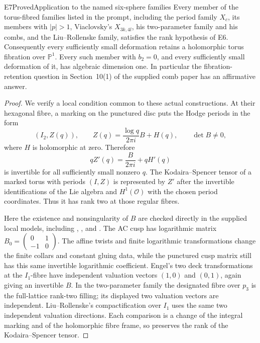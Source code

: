 \begin{statement}{E7}{Proved}{Application to the named six-sphere families}
Every member of the torus-fibred families listed in the prompt,
including the period family $X_c$, its members with $|p|>1$,
Viaclovsky's $X_{3k,4l}$, his two-parameter family and his combs,
and the Liu--Rollenske family, satisfies the rank hypothesis of E6.
Consequently every sufficiently small deformation retains a
holomorphic torus fibration over $\mathbb P^1$. Every such member
with $b_2=0$, and every sufficiently small deformation of it, has
algebraic dimension one. In particular the fibration-retention
question in Section~10(1) of the supplied comb paper has an
affirmative answer.
\end{statement}
\begin{proof}
We verify a local condition common to these actual constructions.
At their hexagonal fibre, a marking on the punctured disc puts
the Hodge periods in the form
\begin{equation}\label{eq:E-log-period}
  (I_2,Z(q)),\qquad
 Z(q)=\frac{\log q}{2\pi i}B+H(q),
 \qquad \det B\ne0,
\end{equation}
where $H$ is holomorphic at zero. Therefore
\[
 qZ'(q)=\frac{B}{2\pi i}+qH'(q)
\]
is invertible for all sufficiently small nonzero $q$. The
Kodaira--Spencer tensor of a marked torus with periods $(I,Z)$
is represented by $Z'$ after the invertible identifications of
the Lie algebra and $H^1(\mathcal O)$ with the chosen period
coordinates. Thus it has rank two at those regular fibres.

Here the existence and nonsingularity of $B$ are checked directly
in the supplied local models, including
\cite[Proposition labelled \texttt{hexfill}]{Viaclovsky2026Combs},
\cite[Proposition labelled \texttt{mum}]{Viaclovsky2026Two}, and
\cite[Proposition labelled \texttt{prop: compactification X}]{LiuRollenske2026}.
The AC cusp has logarithmic matrix
$B_0=\left(\begin{smallmatrix}0&1\\-1&0\end{smallmatrix}\right)$.
The affine twists and finite logarithmic transformations change
the finite collars and constant gluing data, while the punctured
cusp matrix still has this same invertible logarithmic coefficient.
Engel's two deck transformations at the $I_1$-fibre have independent
valuation vectors $(1,0)$ and $(0,1)$, again giving an invertible
$B$. In the two-parameter family the designated fibre over $p_3$
is the full-lattice rank-two filling; its displayed two valuation
vectors are independent. Liu--Rollenske's compactification over
$I_1$ uses the same two independent valuation directions. Each
comparison is a change of the integral marking and of the
holomorphic fibre frame, so preserves the rank of the
Kodaira--Spencer tensor.


\end{proof}
